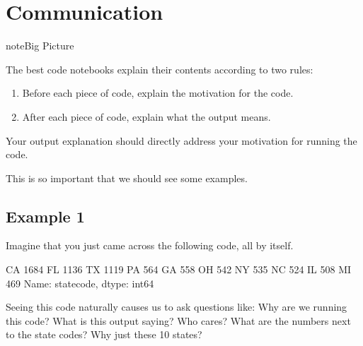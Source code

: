 \documentclass[letterpaper,10pt,english]{sphinxmanual}
\begin{document}
\section{Communication}
\label{\detokenize{chapter-5-before-and-after:communication}}
\begin{sphinxadmonition}{note}{Big Picture}

The best code notebooks explain their contents according to two rules:
\begin{enumerate}
%
\item {} 
Before each piece of code, explain the motivation for the code.

\item {} 
After each piece of code, explain what the output means.

\end{enumerate}

 Your output explanation should directly address your motivation for running the code.
\end{sphinxadmonition}

This is so important that we should see some examples.


\subsection{Example 1}
\label{\detokenize{chapter-5-before-and-after:example-1}}
Imagine that you just came across the following code, all by itself.

\begin{sphinxVerbatim}[commandchars=\\\{\}]
\PYG{p}{[}\PYG{p}{]}  
\end{sphinxVerbatim}

\begin{sphinxVerbatim}[commandchars=\\\{\}]
CA    1684
FL    1136
TX    1119
PA     564
GA     558
OH     542
NY     535
NC     524
IL     508
MI     469
Name: state\PYGZus{}code, dtype: int64
\end{sphinxVerbatim}

Seeing this code naturally causes us to ask questions like:  Why are we running this code?  What is this output saying?  Who cares?  What are the numbers next to the state codes?  Why just these 10 states?
\end{document}
